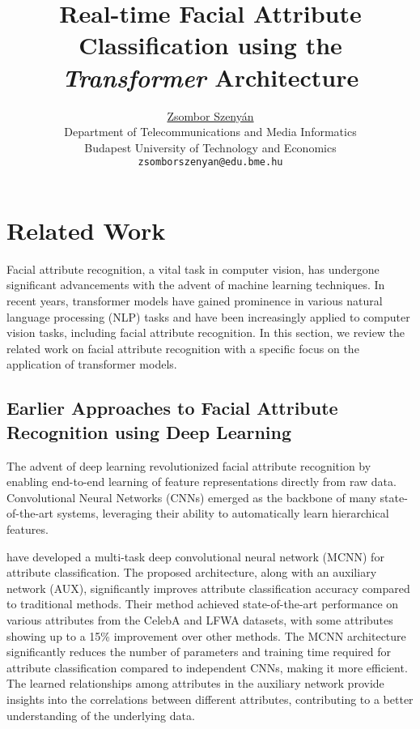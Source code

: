 \documentclass{article}
\title{Real-time Facial Attribute Classification using the \emph{Transformer} Architecture}
\author{ \href{www.linkedin.com/in/zsomborszenyan}{\hspace{1mm}Zsombor Szenyán} \\
  Department of Telecommunications and Media Informatics\\
	Budapest University of Technology and Economics\\
	\texttt{zsomborszenyan@edu.bme.hu} \\
}
\begin{document}
\maketitle






\section{Related Work}
Facial attribute recognition, a vital task in computer vision, has undergone significant advancements with the advent of machine learning techniques. In recent years, transformer models have gained prominence in various natural language processing (NLP) tasks and have been increasingly applied to computer vision tasks, including facial attribute recognition. In this section, we review the related work on facial attribute recognition with a specific focus on the application of transformer models.
\subsection{Earlier Approaches to Facial Attribute Recognition using Deep Learning}
The advent of deep learning revolutionized facial attribute recognition by enabling end-to-end learning of feature representations directly from raw data. Convolutional Neural Networks (CNNs) emerged as the backbone of many state-of-the-art systems, leveraging their ability to automatically learn hierarchical features.

\citet{DBLP:journals/corr/HandC16} have developed a multi-task deep convolutional neural network (MCNN) for attribute classification.
The proposed architecture, along with an auxiliary network (AUX), significantly improves attribute classification accuracy compared to traditional methods.
Their method achieved state-of-the-art performance on various attributes from the CelebA and LFWA datasets, with some attributes showing up to a 15\% improvement over other methods.
The MCNN architecture significantly reduces the number of parameters and training time required for attribute classification compared to independent CNNs, making it more efficient.
The learned relationships among attributes in the auxiliary network provide insights into the correlations between different attributes, contributing to a better understanding of the underlying data.
\end{document}
